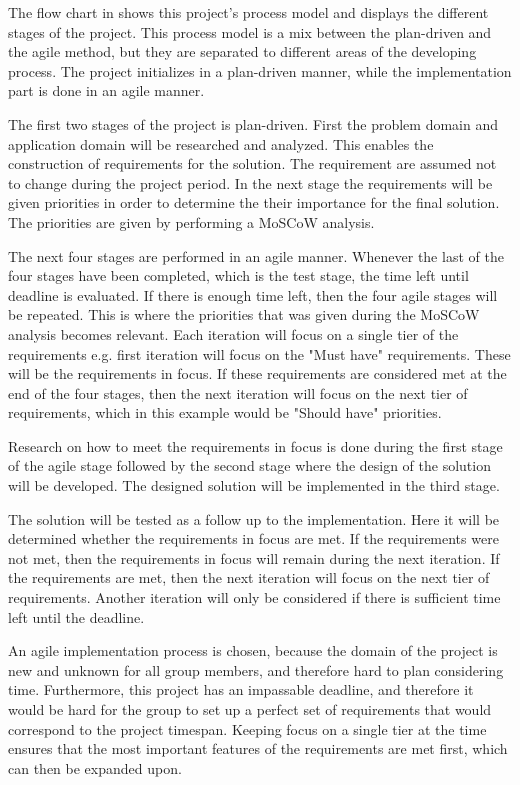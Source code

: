 The flow chart in  shows this project's process model and displays the different stages of the project. This process model is a mix between the plan-driven and the agile method, but they are separated to different areas of the developing process. The project initializes in a plan-driven manner, while the implementation part is done in an agile manner.

The first two stages of the project is plan-driven. First the problem domain and application domain will be researched and analyzed. This enables the construction of requirements for the solution. The requirement are assumed not to change during the project period. In the next stage the requirements will be given priorities in order to determine the their importance for the final solution. The priorities are given by performing a MoSCoW analysis.

The next four stages are performed in an agile manner. Whenever the last of the four stages have been completed, which is the test stage, the time left until deadline is evaluated. If there is enough time left, then the four agile stages will be repeated. This is where the priorities that was given during the MoSCoW analysis becomes relevant. Each iteration will focus on a single tier of the requirements e.g. first iteration will focus on the "Must have" requirements. These will be the requirements in focus. If these requirements are considered met at the end of the four stages, then the next iteration will focus on the next tier of requirements, which in this example would be "Should have" priorities.

Research on how to meet the requirements in focus is done during the first stage of the agile stage followed by the second stage where the design of the solution will be developed. The designed solution will be implemented in the third stage.

The solution will be tested as a follow up to the implementation. Here it will be determined whether the requirements in focus are met. If the requirements were not met, then the requirements in focus will remain during the next iteration. If the requirements are met, then the next iteration will focus on the next tier of requirements. Another iteration will only be considered if there is sufficient time left until the deadline.

An agile implementation process is chosen, because the domain of the project is new and unknown for all group members, and therefore hard to plan considering time. Furthermore, this project has an impassable deadline, and therefore it would be hard for the group to set up a perfect set of requirements that would correspond to the project timespan. Keeping focus on a single tier at the time ensures that the most important features of the requirements are met first, which can then be expanded upon.
